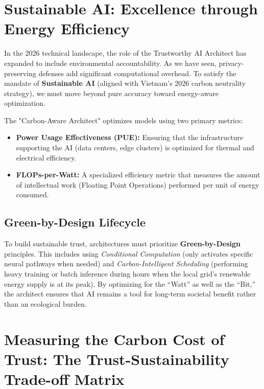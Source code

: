 \section{Sustainable AI: Excellence through Energy Efficiency}
\label{sec:sustainable_ai}

In the 2026 technical landscape, the role of the Trustworthy AI Architect has expanded to include environmental accountability. As we have seen, privacy-preserving defenses add significant computational overhead. To satisfy the mandate of \textbf{Sustainable AI} \cite{schwartz2020} (aligned with Vietnam's 2026 carbon neutrality strategy), we must move beyond pure accuracy toward energy-aware optimization.

The "Carbon-Aware Architect" optimizes models using two primary metrics:
\begin{itemize}
    \item \textbf{Power Usage Effectiveness (PUE):} Ensuring that the infrastructure supporting the AI (data centers, edge clusters) is optimized for thermal and electrical efficiency.
    \item \textbf{FLOPs-per-Watt:} A specialized efficiency metric that measures the amount of intellectual work (Floating Point Operations) performed per unit of energy consumed.
\end{itemize}

\subsection{Green-by-Design Lifecycle}
To build sustainable trust, architectures must prioritize \textbf{Green-by-Design} principles. This includes using \textit{Conditional Computation} (only activates specific neural pathways when needed) and \textit{Carbon-Intelligent Scheduling} (performing heavy training or batch inference during hours when the local grid's renewable energy supply is at its peak). By optimizing for the ``Watt'' as well as the ``Bit,'' the architect ensures that AI remains a tool for long-term societal benefit rather than an ecological burden.


\section{Measuring the Carbon Cost of Trust: The
         Trust-Sustainability Trade-off Matrix}
\label{sec:carbon-cost-of-trust}

